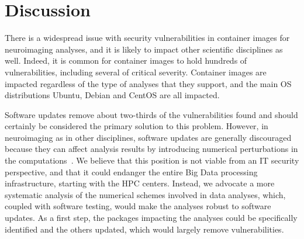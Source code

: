 \documentclass[a4paper,num-refs]{oup-contemporary}
\begin{document}





\section{Discussion}

There is a widespread issue with security vulnerabilities in container
images for neuroimaging analyses, and it is likely to impact other
scientific disciplines as well. Indeed, it is common for container images
to hold hundreds of vulnerabilities, including several of critical
severity. Container images are impacted regardless of the type of analyses
that they support, and the main OS distributions Ubuntu, Debian and CentOS
are all impacted.

Software updates remove about two-thirds of the vulnerabilities found and
should certainly be considered the primary solution to this problem.
However, in neuroimaging as in other disciplines, software updates are
generally discouraged because they can affect analysis results by
introducing numerical perturbations in the
computations~\cite{gronenschild2012effects,glatard2015reproducibility}. We
believe that this position is not viable from an IT security perspective,
and that it could endanger the entire Big Data processing infrastructure,
starting with the HPC centers. Instead, we advocate a more systematic
analysis of the numerical schemes involved in data analyses, which, coupled
with software testing, would make the analyses robust to software updates.
As a first step, the packages impacting the analyses could be specifically
identified and the others updated, which would largely remove
vulnerabilities.
\end{document}
